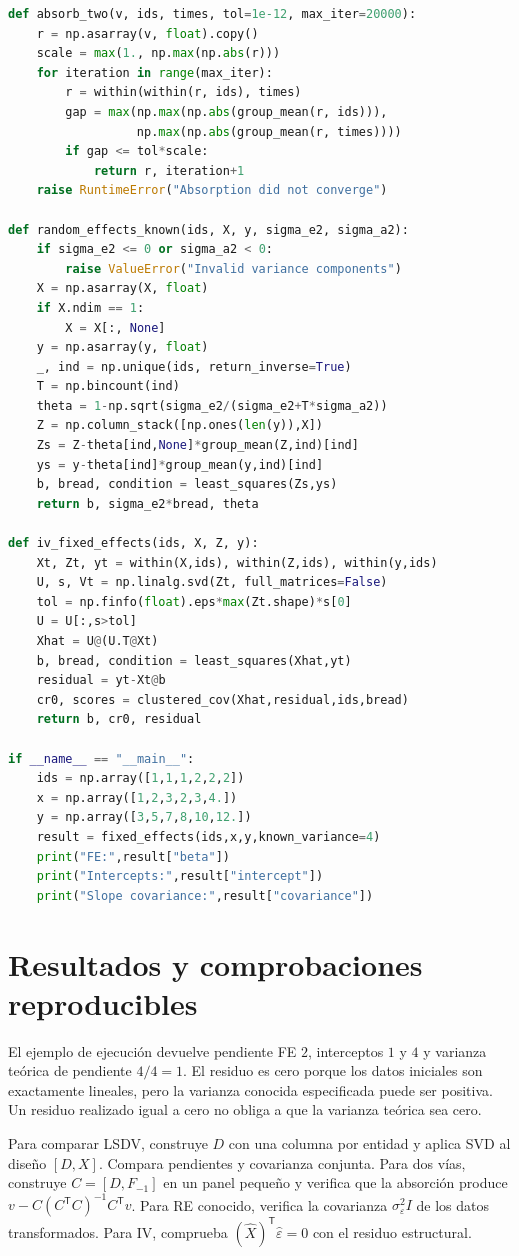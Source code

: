 \documentclass[11pt,a4paper]{article}
\newcommand{\T}{^{\mathsf T}}
\theoremstyle{definition}
\newcommand{\eps}{\varepsilon}
\begin{document}
\begin{lstlisting}[language=Python]
def absorb_two(v, ids, times, tol=1e-12, max_iter=20000):
    r = np.asarray(v, float).copy()
    scale = max(1., np.max(np.abs(r)))
    for iteration in range(max_iter):
        r = within(within(r, ids), times)
        gap = max(np.max(np.abs(group_mean(r, ids))),
                  np.max(np.abs(group_mean(r, times))))
        if gap <= tol*scale:
            return r, iteration+1
    raise RuntimeError("Absorption did not converge")

def random_effects_known(ids, X, y, sigma_e2, sigma_a2):
    if sigma_e2 <= 0 or sigma_a2 < 0:
        raise ValueError("Invalid variance components")
    X = np.asarray(X, float)
    if X.ndim == 1:
        X = X[:, None]
    y = np.asarray(y, float)
    _, ind = np.unique(ids, return_inverse=True)
    T = np.bincount(ind)
    theta = 1-np.sqrt(sigma_e2/(sigma_e2+T*sigma_a2))
    Z = np.column_stack([np.ones(len(y)),X])
    Zs = Z-theta[ind,None]*group_mean(Z,ind)[ind]
    ys = y-theta[ind]*group_mean(y,ind)[ind]
    b, bread, condition = least_squares(Zs,ys)
    return b, sigma_e2*bread, theta

def iv_fixed_effects(ids, X, Z, y):
    Xt, Zt, yt = within(X,ids), within(Z,ids), within(y,ids)
    U, s, Vt = np.linalg.svd(Zt, full_matrices=False)
    tol = np.finfo(float).eps*max(Zt.shape)*s[0]
    U = U[:,s>tol]
    Xhat = U@(U.T@Xt)
    b, bread, condition = least_squares(Xhat,yt)
    residual = yt-Xt@b
    cr0, scores = clustered_cov(Xhat,residual,ids,bread)
    return b, cr0, residual

if __name__ == "__main__":
    ids = np.array([1,1,1,2,2,2])
    x = np.array([1,2,3,2,3,4.])
    y = np.array([3,5,7,8,10,12.])
    result = fixed_effects(ids,x,y,known_variance=4)
    print("FE:",result["beta"])
    print("Intercepts:",result["intercept"])
    print("Slope covariance:",result["covariance"])


\end{lstlisting}
\section{Resultados y comprobaciones reproducibles}
El ejemplo de ejecución devuelve pendiente FE $2$, interceptos $1$ y $4$ y varianza teórica de pendiente $4/4=1$. El residuo es cero porque los datos iniciales son exactamente lineales, pero la varianza conocida especificada puede ser positiva. Un residuo realizado igual a cero no obliga a que la varianza teórica sea cero.

Para comparar LSDV, construye $D$ con una columna por entidad y aplica SVD al diseño $[D,X]$. Compara pendientes y covarianza conjunta. Para dos vías, construye $C=[D,F_{-1}]$ en un panel pequeño y verifica que la absorción produce $v-C(C\T C)^{-1}C\T v$. Para RE conocido, verifica la covarianza $\sigma_\eps^2I$ de los datos transformados. Para IV, comprueba $(\widehat X)\T\widehat\eps=0$ con el residuo estructural.
\end{document}
